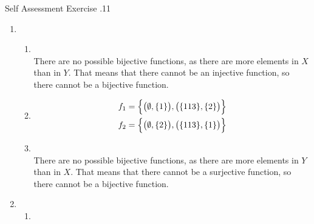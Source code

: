 \documentclass[\main/notes.tex]{subfiles}
\begin{document}
			\begin{exercise}{Self Assessment Exercise \thechapter.11}
				\begin{enumerate}
					\item {}
						\begin{enumerate}[label=(\alph*)]
							\item {}\\
								There are no possible bijective functions, as there are more elements in $X$ than in $Y$. That means that there cannot be an injective function, so there cannot be a bijective function.
							\item {}
								\begin{align*}
									f_{1} &= \Bigl\{\bigl(\emptyset, \{1\}\bigr), \bigl(\{113\}, \{2\}\bigr)\Bigr\}\\
									f_{2} &= \Bigl\{\bigl(\emptyset, \{2\}\bigr), \bigl(\{113\}, \{1\}\bigr)\Bigr\}
								\end{align*}
							\item {}\\
								There are no possible bijective functions, as there are more elements in $Y$ than in $X$. That means that there cannot be a surjective function, so there cannot be a bijective function.
						\end{enumerate}
					\item {}
						\begin{enumerate}[label=(\alph*)]
							\item {}
\end{enumerate}
\end{enumerate}
\end{exercise}
\end{document}
